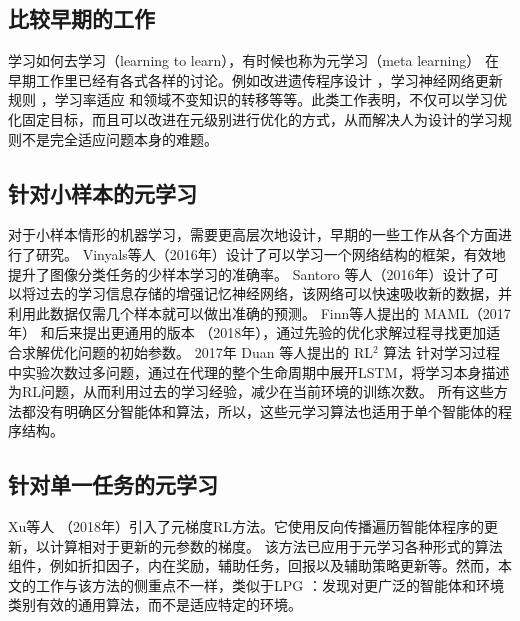 \subsection{比较早期的工作}
学习如何去学习（learning to learn），有时候也称为元学习（meta learning）\cite{MetaLearningComputer2021} 在早期工作里已经有各式各样的讨论。例如改进遗传程序设计\cite{ohDiscoveringReinforcementLearning2020} \cite{schmidhuberEvolutionaryPrinciplesSelfreferential1987}，学习神经网络更新规则 \cite{bengioLearningSynapticLearning1990}，学习率适应 \cite{suttonAdaptingBiasGradient1992} 和领域不变知识的转移\cite{thrunLearningOneMore1994}等等。此类工作表明，不仅可以学习优化固定目标，而且可以改进在元级别进行优化的方式，从而解决人为设计的学习规则不是完全适应问题本身的难题。


\subsection{针对小样本的元学习}
对于小样本情形的机器学习，需要更高层次地设计，早期的一些工作从各个方面进行了研究。
Vinyals等人\cite{vinyalsMatchingNetworksOne2016b}（2016年）设计了可以学习一个网络结构的框架，有效地提升了图像分类任务的少样本学习的准确率。
Santoro 等人\cite{santoroMetaLearningMemoryAugmentedNeural2016}（2016年）设计了可以将过去的学习信息存储的增强记忆神经网络，该网络可以快速吸收新的数据，并利用此数据仅需几个样本就可以做出准确的预测。
Finn等人提出的 MAML（2017年）\cite{finnModelagnosticMetalearningFast2017} 和后来提出更通用的版本 \cite{finnMetaLearningUniversalityDeep2018}（2018年），通过先验的优化求解过程寻找更加适合求解优化问题的初始参数。
2017年 Duan 等人提出的 RL$^2$ 算法 \cite{duanRLFastReinforcement2016} 针对学习过程中实验次数过多问题，通过在代理的整个生命周期中展开LSTM，将学习本身描述为RL问题，从而利用过去的学习经验，减少在当前环境的训练次数。
所有这些方法都没有明确区分智能体和算法，所以，这些元学习算法也适用于单个智能体的程序结构。

\subsection{针对单一任务的元学习}
Xu等人\cite{xuMetagradientReinforcementLearning2018} （2018年）引入了元梯度RL方法。它使用反向传播遍历智能体程序的更新，以计算相对于更新的元参数的梯度。
该方法已应用于元学习各种形式的算法组件，例如折扣因子，内在奖励，辅助任务，回报以及辅助策略更新等\cite{ohDiscoveringReinforcementLearning2020}。然而，本文的工作与该方法的侧重点不一样，类似于LPG \cite{ohDiscoveringReinforcementLearning2020}：发现对更广泛的智能体和环境类别有效的通用算法，而不是适应特定的环境。

